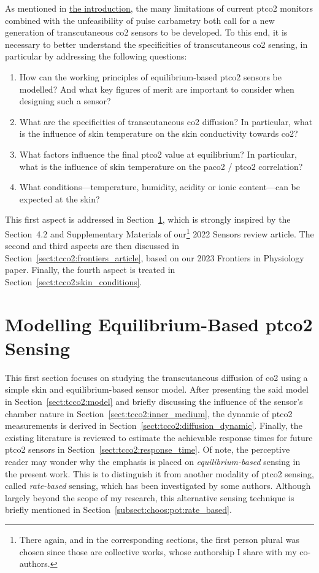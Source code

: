 As mentioned in \hyperref[chap:intro]{the introduction}, the many limitations of current \gls{ptco2} monitors combined with the unfeasibility of pulse carbametry both call for a new generation of transcutaneous \gls{co2} sensors to be developed. To this end, it is necessary to better understand the specificities of transcutaneous \gls{co2} sensing, in particular by addressing the following questions:
\begin{enumerate}
	\item How can the working principles of equilibrium-based \gls{ptco2} sensors be modelled? And what key figures of merit are important to consider when designing such a sensor?
	\item What are the specificities of transcutaneous \gls{co2} diffusion? In particular, what is the influence of skin temperature on the skin conductivity towards \gls{co2}?
	\item What factors influence the final \gls{ptco2} value at equilibrium? In particular, what is the influence of skin temperature on the \gls{paco2} / \gls{ptco2} correlation?
	\item What conditions---temperature, humidity, acidity or ionic content---can be expected at the skin?
\end{enumerate}

This first aspect is addressed in Section~\ref{sect:tcco2:modelling_tc_sensing}, which is strongly inspired by the Section~4.2 and Supplementary Materials of our\footnote{There again, and in the corresponding sections, the first person plural was chosen since those are collective works, whose authorship I share with my co-authors.} 2022 Sensors review article\cite{dervieux2022}. The second and third aspects are then discussed in Section~\ref{sect:tcco2:frontiers_article}, based on our 2023 Frontiers in Physiology paper\cite{dervieux2023rate}. Finally, the fourth aspect is treated in Section~\ref{sect:tcco2:skin_conditions}.

\section{Modelling Equilibrium-Based \texorpdfstring{\gls{ptco2}}{tcpCO2} Sensing}\label{sect:tcco2:modelling_tc_sensing}

This first section focuses on studying the transcutaneous diffusion of \gls{co2} using a simple skin and equilibrium-based sensor model. After presenting the said model in Section~\ref{sect:tcco2:model} and briefly discussing the influence of the sensor's chamber nature in Section~\ref{sect:tcco2:inner_medium}, the dynamic of \gls{ptco2} measurements is derived in Section~\ref{sect:tcco2:diffusion_dynamic}. Finally, the existing literature is reviewed to estimate the achievable response times for future \gls{ptco2} sensors in Section~\ref{sect:tcco2:response_time}. Of note, the perceptive reader may wonder why the emphasis is placed on \emph{equilibrium-based} sensing in the present work. This is to distinguish it from another modality of \gls{ptco2} sensing, called \emph{rate-based} sensing, which has been investigated by some authors. Although largely beyond the scope of my research, this alternative sensing technique is briefly mentioned in Section~\ref{subsect:choos:pot:rate_based}.


